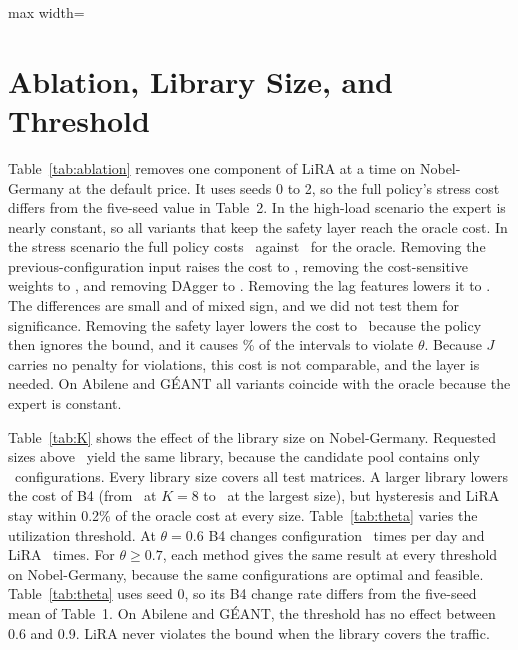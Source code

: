 \documentclass[preprint,12pt]{elsarticle}
\begin{document}
\begin{table}[h!]
\centering
\caption{Choice of Model on Nobel-Germany (Base Scenario, Seed 0). Chg/d: Changes per Day}
\label{tab:models}
\footnotesize
\setlength{\tabcolsep}{3pt}
\begin{adjustbox}{max width=\linewidth}\end{adjustbox}
\end{table}


\section{Ablation, Library Size, and Threshold}\label{sec:res-ablation}

Table~\ref{tab:ablation} removes one component of LiRA at a time on Nobel-Germany at the default price. It uses seeds 0 to 2, so the full policy's stress cost differs from the five-seed value in Table~2. In the high-load scenario the expert is nearly constant, so all variants that keep the safety layer reach the oracle cost. In the stress scenario the full policy costs \ablStressFull\ against \ablStressO\ for the oracle. Removing the previous-configuration input raises the cost to \ablStressNoPrev, removing the cost-sensitive weights to \ablStressNoCS, and removing DAgger to \ablStressNoDagger. Removing the lag features lowers it to \ablStressNoLag. The differences are small and of mixed sign, and we did not test them for significance. Removing the safety layer lowers the cost to \ablStressNoSafe\ because the policy then ignores the bound, and it causes \ablStressNoSafeViol\% of the intervals to violate $\theta$. Because $J$ carries no penalty for violations, this cost is not comparable, and the layer is needed. On Abilene and G\'{E}ANT all variants coincide with the oracle because the expert is constant.


Table~\ref{tab:K} shows the effect of the library size on Nobel-Germany. Requested sizes above \KactualMax\ yield the same library, because the candidate pool contains only \nobCand\ configurations. Every library size covers all test matrices. A larger library lowers the cost of B4 (from \KBFouratEight\ at $K=8$ to \KBFouratSixFour\ at the largest size), but hysteresis and LiRA stay within 0.2\% of the oracle cost at every size. Table~\ref{tab:theta} varies the utilization threshold. At $\theta=0.6$ B4 changes configuration \thSixBFourchg\ times per day and LiRA \thSixLiRAchg\ times. For $\theta\ge0.7$, each method gives the same result at every threshold on Nobel-Germany, because the same configurations are optimal and feasible. Table~\ref{tab:theta} uses seed 0, so its B4 change rate differs from the five-seed mean of Table~1. On Abilene and G\'{E}ANT, the threshold has no effect between 0.6 and 0.9. LiRA never violates the bound when the library covers the traffic.
\end{document}

